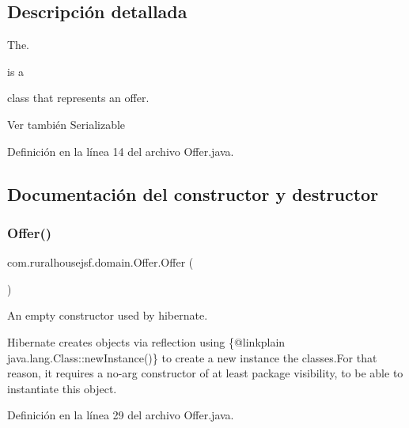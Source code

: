 \subsection{Descripción detallada}
The. 


\begin{DoxyCode}{0}
\end{DoxyCode}
 is a
\begin{DoxyCode}{0}
\end{DoxyCode}
 class that represents an offer.

\begin{DoxySeeAlso}{Ver también}
Serializable 
\end{DoxySeeAlso}


Definición en la línea 14 del archivo Offer.\+java.



\subsection{Documentación del constructor y destructor}
\mbox{\label{a00184_aa25c14124afd5f3f53c26ef4a564397d}} 
\subsubsection{\texorpdfstring{Offer()}{Offer()}\hspace{0.1cm}{\footnotesize\ttfamily [1/3]}}
{\footnotesize\ttfamily com.\+ruralhousejsf.\+domain.\+Offer.\+Offer (\begin{DoxyParamCaption}{ }\end{DoxyParamCaption})\hspace{0.3cm}{\ttfamily [package]}}



An empty constructor used by hibernate. 

Hibernate creates objects via reflection using \{@linkplain java.\+lang.\+Class\+::new\+Instance()\} to create a new instance the classes.\+For that reason, it requires a no-\/arg constructor of at least package visibility, to be able to instantiate this object. 

Definición en la línea 29 del archivo Offer.\+java.

